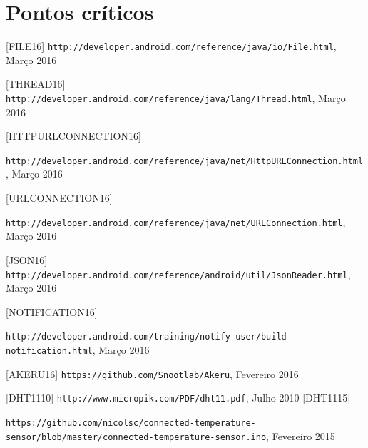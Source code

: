 \documentclass[a4paper]{article}
\begin{document}
\section{Pontos críticos}


\begin{thebibliography}{9}

  [FILE16] \texttt{http://developer.android.com/reference/java/io/File.html}, Março 2016
  
  [THREAD16] \texttt{http://developer.android.com/reference/java/lang/Thread.html}, Março 2016
  
  [HTTPURLCONNECTION16] \begin{sloppypar} \texttt{http://developer.android.com/reference/java/net/HttpURLConnection.html}, Março 2016 \end{sloppypar}
  
  [URLCONNECTION16] \begin{sloppypar}\texttt{http://developer.android.com/reference/java/net/URLConnection.html}, Março 2016 \end{sloppypar}
  
  [JSON16] \texttt{http://developer.android.com/reference/android/util/JsonReader.html}, Março 2016
  
  [NOTIFICATION16] \begin{sloppypar}\texttt{http://developer.android.com/training/notify-user/build-notification.html}, Março 2016 \end{sloppypar}
  
  [AKERU16] \texttt{https://github.com/Snootlab/Akeru}, Fevereiro 2016
  
  [DHT1110] \texttt{http://www.micropik.com/PDF/dht11.pdf}, Julho 2010
  [DHT1115] \begin{sloppypar} \texttt{https://github.com/nicolsc/connected-temperature-sensor/blob/master/connected-temperature-sensor.ino}, Fevereiro 2015  \end{sloppypar}


\end{thebibliography}
\end{document}
